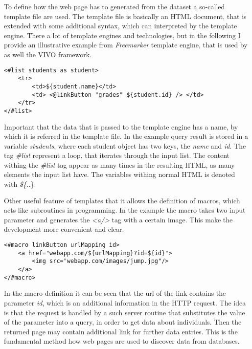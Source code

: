 To define how the web page has to generated from the dataset a so-called template file are used. The template file is basically an HTML document, that is extended with some additional syntax, which can interpreted by the template engine. There a lot of template engines and technologies, but in the following I provide an illustrative example from \textit{Freemarker} template engine, that is used by as well the VIVO framework.

\begin{lstlisting}[captionpos=b, caption=Template file example, label=skullJSON, belowskip=1em, aboveskip=2em,
basicstyle=\footnotesize,frame=single]
<#list students as student>
	<tr>
		<td>${student.name}</td>
		<td> <@linkButton "grades" ${student.id} /> </td>
	</tr>
</#list>
\end{lstlisting}

Important that the data that is passed to the template engine has a name, by which it is referred in the template file. In the example query result is stored in a variable \textit{students}, where each student object has two keys, the \textit{name} and \textit{id}. The tag \textit{\#list} represent a loop, that iterates through the input list. The content withing the \textit{\#list} tag appear as many times in the resulting HTML, as many elements the input list have. The variables withing normal HTML is denoted with \textit{\$\{..}\}. 

Other useful feature of templates that it allows the definition of macros, which acts like subroutines in programming. In the example the macro \textit{\@linkButton} takes two input parameter and generates the \textit{<a/>} tag with a certain image. This make the development more convenient and clear.

\begin{lstlisting}[captionpos=b, caption=Macro definition, label=skullJSON, belowskip=1em, aboveskip=2em,
basicstyle=\footnotesize,frame=single]
<#macro linkButton urlMapping id>
	<a href="webapp.com/${urlMapping}?id=${id}">
		<img src="webapp.com/images/jump.jpg"/>
	</a>
</#macro>
\end{lstlisting}


In the macro definition it can be seen that the url of the link contains the parameter \textit{id}, which is an additional information in the HTTP request. The idea is that the request is handled by a such server routine that substitutes the value of the parameter into a query, in order to get data about individuals. Then the returned page may contain additional link for further data entries. This is the fundamental method how web pages are used to discover data from databases.

